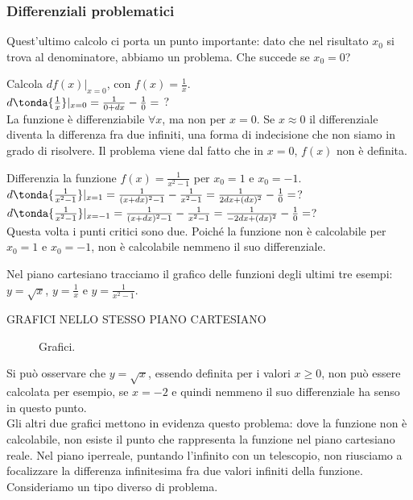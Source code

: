 \subsubsection{Differenziali problematici}
\label{subsubsec:diff01_diffproblemi}

Quest'ultimo calcolo ci porta un punto importante: dato che nel risultato
$x_0$ si trova al denominatore, abbiamo un problema. Che succede se $x_0=0$?
\begin{esempio}
 Calcola $df(x)|_{x=0}$, con $f(x)=\frac{1}{x}$.\\
 $d\tonda{\frac{1}{x}}|_{x=0}=\frac{1}{0+dx}-\frac{1}{0}=$ ?\\
 La funzione è differenziabile $\forall x$, ma non per $x=0$. Se $x\approx 0$
 il differenziale diventa la differenza fra due infiniti, una forma di 
 indecisione che non siamo in grado di risolvere. Il problema viene dal fatto 
 che in $x=0$, $f(x)$ non è definita.
\end{esempio}

\begin{esempio}
Differenzia la funzione $f(x)=\frac{1}{x^2-1}$ per $x_0=1$ e $x_0=-1$.\\
$d\tonda{\frac{1}{x^2-1}}|_{x=1}=\frac{1}{(x+dx)^2-1}-\frac{1}{x^2-1}=
\frac{1}{2dx+(dx)^2}-\frac{1}{0}=$?\\
$d\tonda{\frac{1}{x^2-1}}|_{x=-1}=\frac{1}{(x+dx)^2-1}-\frac{1}{x^2-1}=
\frac{1}{-2dx+(dx)^2}-\frac{1}{0}=$?\\
Questa volta i punti critici sono due. Poiché la funzione non è calcolabile
per $x_0=1$ e $x_0=-1$, non è calcolabile nemmeno il suo differenziale.
\end{esempio}

Nel piano cartesiano tracciamo il grafico delle funzioni degli ultimi 
tre esempi: $y=\sqrt{x}$, $y=\frac{1}{x}$ e $y=\frac{1}{x^2-1}$.

GRAFICI NELLO STESSO PIANO CARTESIANO
\begin{figure}[h]
\begin{inaccessibleblock}
 \begin{center}
\radice
 \end{center}
\end{inaccessibleblock}
\caption{Grafici.} \label{fig:grafici}
\end{figure}

Si può osservare che $y=\sqrt{x}$, essendo definita per i valori $x\ge 0$, 
non può essere calcolata per esempio, se $x=-2$ e quindi nemmeno il suo 
differenziale ha senso in questo punto.\\
Gli altri due grafici mettono in evidenza questo problema: dove la funzione 
non è calcolabile, non esiste il punto che rappresenta la funzione nel piano 
cartesiano reale. Nel piano iperreale, puntando l'infinito con un telescopio,
non riusciamo a focalizzare la differenza infinitesima fra due valori infiniti
della funzione.\\
Consideriamo un tipo diverso di problema.

